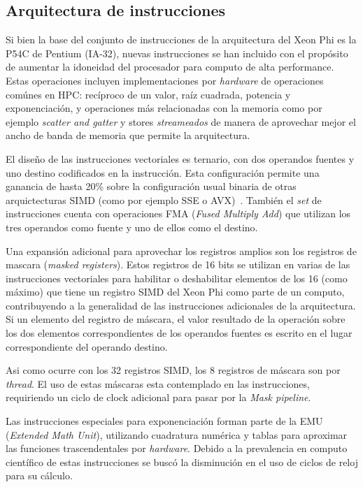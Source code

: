 \subsection{Arquitectura de instrucciones}

Si bien la base del conjunto de instrucciones de la arquitectura del Xeon Phi es la P54C de Pentium (IA-32), nuevas instrucciones
se han incluido con el prop\'osito de aumentar la idoneidad del procesador para computo de alta performance. 
Estas operaciones incluyen implementaciones por \textit{hardware} de operaciones com\'unes en HPC: rec\'iproco de un valor, 
ra\'iz cuadrada, potencia y exponenciaci\'on, y operaciones m\'as relacionadas con la memoria como por ejemplo \textit{scatter and gatter} 
y stores \textit{streameados} de manera de aprovechar mejor el ancho de banda de memoria que permite la arquitectura.

El dise\~no de las instrucciones vectoriales es ternario, con dos operandos fuentes y uno destino codificados en la instrucci\'on.
Esta configuraci\'on permite una ganancia de hasta 20\% sobre la configuraci\'on usual binaria de otras arquictecturas SIMD (como
por ejemplo SSE o AVX)~\cite{BookXeonPhi}. Tambi\'en el \textit{set} de instrucciones cuenta con operaciones FMA (\textit{Fused
Multiply Add}) que utilizan los tres operandos como fuente y uno de ellos como el destino.

Una expansi\'on adicional para aprovechar los registros amplios son los registros de mascara (\textit{masked registers}).
Estos registros de 16 bits se utilizan en varias de las instrucciones vectoriales para habilitar o deshabilitar elementos
de los 16 (como m\'aximo) que tiene un registro SIMD del Xeon Phi como parte de un computo, contribuyendo a la generalidad de
las instrucciones adicionales de la arquitectura. Si un elemento del registro de m\'ascara, el valor resultado de la operaci\'on
sobre los dos elementos correspondientes de los operandos fuentes es escrito en el lugar correspondiente del operando destino.

Asi como ocurre con los 32 registros SIMD, los 8 registros de m\'ascara son
por \textit{thread}. El uso de estas m\'ascaras esta contemplado en las instrucciones, requiriendo un ciclo de clock adicional
para pasar por la \textit{Mask pipeline}. 

Las instrucciones especiales para exponenciaci\'on forman parte de la EMU (\textit{Extended Math Unit}), utilizando cuadratura
num\'erica y tablas para aproximar las funciones trascendentales por \textit{hardware}. Debido a la prevalencia en computo
cient\'ifico de estas instrucciones se busc\'o la disminuci\'on en el uso de ciclos de reloj para su c\'alculo.

